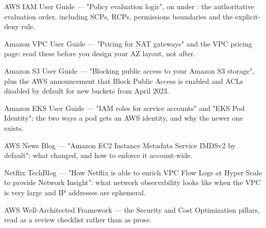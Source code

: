 \begin{iqbox}
\end{iqbox}

\begin{wbitem}
  \item AWS IAM User Guide --- "Policy evaluation logic", on  under : the authoritative evaluation order, including SCPs, RCPs, permissions boundaries and the explicit-deny rule.
  \item Amazon VPC User Guide --- "Pricing for NAT gateways" and the VPC pricing page: read these before you design your AZ layout, not after.
  \item Amazon S3 User Guide --- "Blocking public access to your Amazon S3 storage", plus the AWS announcement that Block Public Access is enabled and ACLs disabled by default for new buckets from April 2023.
  \item Amazon EKS User Guide --- "IAM roles for service accounts" and "EKS Pod Identity": the two ways a pod gets an AWS identity, and why the newer one exists.
  \item AWS News Blog --- "Amazon EC2 Instance Metadata Service IMDSv2 by default": what changed, and how to enforce it account-wide.
  \item Netflix TechBlog --- "How Netflix is able to enrich VPC Flow Logs at Hyper Scale to provide Network Insight": what network observability looks like when the VPC is very large and IP addresses are ephemeral.
  \item AWS Well-Architected Framework --- the Security and Cost Optimization pillars, read as a review checklist rather than as prose.
\end{wbitem}

